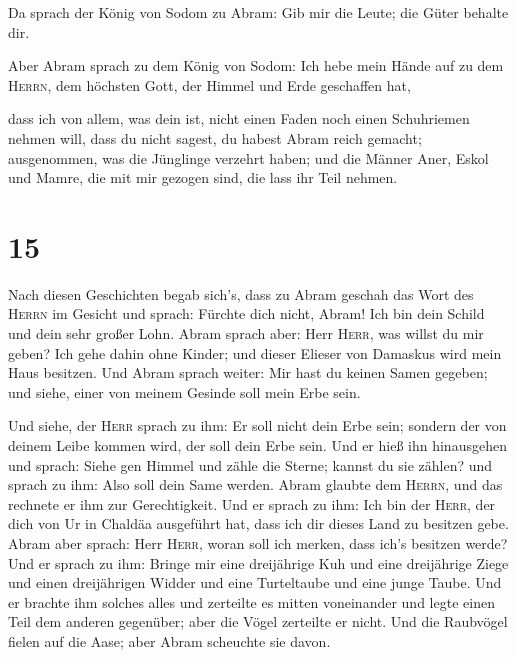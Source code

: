  Da sprach der König von Sodom zu Abram: Gib mir die
Leute; die Güter behalte dir.

 Aber Abram sprach zu dem König von Sodom: Ich hebe mein
Hände auf zu dem \textsc{Herrn}, dem höchsten Gott, der Himmel und Erde
geschaffen hat,

 dass ich von allem, was dein ist, nicht einen Faden noch
einen Schuhriemen nehmen will, dass du nicht sagest, du habest Abram
reich gemacht;  ausgenommen, was die Jünglinge verzehrt
haben; und die Männer Aner, Eskol und Mamre, die mit mir gezogen sind,
die lass ihr Teil nehmen.

\hypertarget{section-14}{%
\section{15}\label{section-14}}

 Nach diesen Geschichten begab sich's, dass zu Abram
geschah das Wort des \textsc{Herrn} im Gesicht und sprach: Fürchte dich
nicht, Abram! Ich bin dein Schild und dein sehr großer Lohn.
 Abram sprach aber: Herr \textsc{Herr}, was willst du mir
geben? Ich gehe dahin ohne Kinder; und dieser Elieser von Damaskus wird
mein Haus besitzen.  Und Abram sprach weiter: Mir hast du
keinen Samen gegeben; und siehe, einer von meinem Gesinde soll mein Erbe
sein.

 Und siehe, der \textsc{Herr} sprach zu ihm: Er soll nicht
dein Erbe sein; sondern der von deinem Leibe kommen wird, der soll dein
Erbe sein.  Und er hieß ihn hinausgehen und sprach: Siehe
gen Himmel und zähle die Sterne; kannst du sie zählen? und sprach zu
ihm: Also soll dein Same werden.  Abram glaubte dem
\textsc{Herrn}, und das rechnete er ihm zur Gerechtigkeit.
 Und er sprach zu ihm: Ich bin der \textsc{Herr}, der dich
von Ur in Chaldäa ausgeführt hat, dass ich dir dieses Land zu besitzen
gebe.  Abram aber sprach: Herr \textsc{Herr}, woran soll
ich merken, dass ich's besitzen werde?  Und er sprach zu
ihm: Bringe mir eine dreijährige Kuh und eine dreijährige Ziege und
einen dreijährigen Widder und eine Turteltaube und eine junge Taube.
 Und er brachte ihm solches alles und zerteilte es mitten
voneinander und legte einen Teil dem anderen gegenüber; aber die Vögel
zerteilte er nicht.  Und die Raubvögel fielen auf die
Aase; aber Abram scheuchte sie davon.

